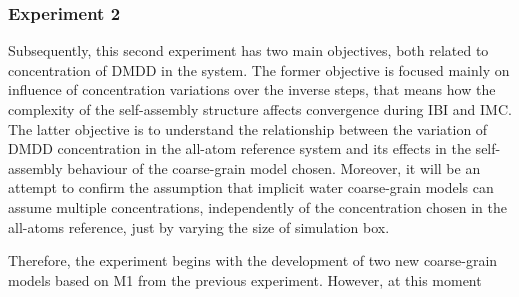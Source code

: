 \documentclass[10pt,a4paper,twoside]{article}
\begin{document}
\subsubsection*{Experiment 2}
 Subsequently, this second experiment has two main objectives, both related to concentration of DMDD in the system. The former objective is focused mainly on influence of concentration variations over the inverse steps, that means how the complexity of the self-assembly 
 structure affects convergence during IBI and IMC. The latter objective is to understand the relationship between the variation of DMDD concentration in the all-atom reference system and its effects in the self-assembly behaviour of the coarse-grain model chosen. Moreover, it will be an attempt to confirm the assumption that implicit water coarse-grain models can assume multiple concentrations, independently of the concentration chosen in the all-atoms reference, just by varying the size of simulation box.  
 
 Therefore, the experiment begins with the development of two new coarse-grain models based on M1  from the previous experiment. However, at this moment 
 
\end{document}
